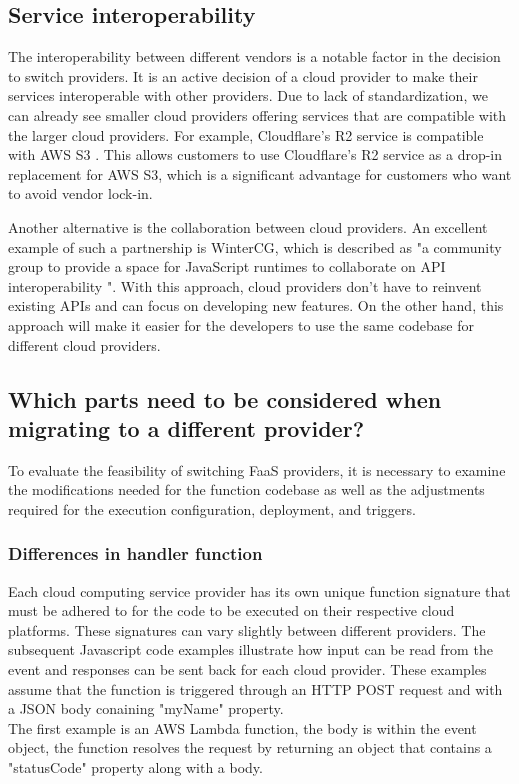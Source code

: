 \subsection{Service interoperability}
\label{subsec:service-interoperability}

The interoperability between different vendors is a notable factor in the decision to switch providers. It is an active decision of a cloud provider to make their services interoperable with other providers. Due to lack of standardization, we can already see smaller cloud providers offering services that are compatible with the larger cloud providers. For example, Cloudflare's R2 service is compatible with AWS S3 \cite{cloudflareinc_cloudflare}. This allows customers to use Cloudflare's R2 service as a drop-in replacement for AWS S3, which is a significant advantage for customers who want to avoid vendor lock-in. 

Another alternative is the collaboration between cloud providers. An excellent example of such a partnership is WinterCG, which is described as "a community group to provide a space for JavaScript runtimes to collaborate on API interoperability \cite{webinteroperableruntimescommunitygroup_wintercg}". With this approach, cloud providers don't have to reinvent existing APIs and can focus on developing new features. On the other hand, this approach will make it easier for the developers to use the same codebase for different cloud providers.

\subsection{Which parts need to be considered when migrating to a different provider?}
To evaluate the feasibility of switching \Gls{FaaS} providers, it is necessary to examine the modifications needed for the function codebase as well as the adjustments required for the execution configuration, deployment, and triggers.

\subsubsection{Differences in handler function}
Each \gls{cloud computing} service provider has its own unique function signature that must be adhered to for the code to be executed on their respective cloud platforms. These signatures can vary slightly between different providers. The subsequent Javascript code examples illustrate how input can be read from the event and responses can be sent back for each cloud provider. These examples assume that the function is triggered through an HTTP POST request and with a JSON body conaining "myName" property. \\
The first example is an AWS Lambda function, the body is within the event object, the function resolves the request by returning an object that contains a "statusCode" property along with a body.

